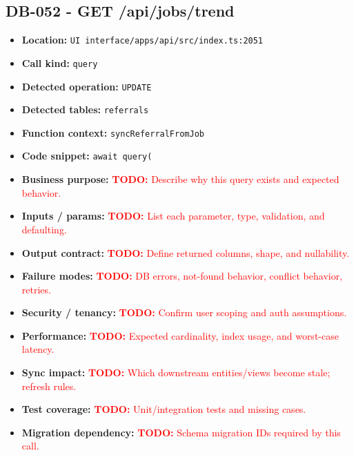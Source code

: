 \documentclass[11pt]{article}
\newcommand{\todoitem}[1]{\textcolor{red}{\textbf{TODO:} #1}}
\begin{document}
\subsection{DB-052 - GET /api/jobs/trend}
\begin{itemize}[leftmargin=1.5em]
\item \textbf{Location:} \texttt{UI interface/apps/api/src/index.ts:2051}
\item \textbf{Call kind:} \texttt{query}
\item \textbf{Detected operation:} \texttt{UPDATE}
\item \textbf{Detected tables:} \texttt{referrals}
\item \textbf{Function context:} \texttt{syncReferralFromJob}
\item \textbf{Code snippet:} \texttt{await query(}
\item \textbf{Business purpose:} \todoitem{Describe why this query exists and expected behavior.}
\item \textbf{Inputs / params:} \todoitem{List each parameter, type, validation, and defaulting.}
\item \textbf{Output contract:} \todoitem{Define returned columns, shape, and nullability.}
\item \textbf{Failure modes:} \todoitem{DB errors, not-found behavior, conflict behavior, retries.}
\item \textbf{Security / tenancy:} \todoitem{Confirm user scoping and auth assumptions.}
\item \textbf{Performance:} \todoitem{Expected cardinality, index usage, and worst-case latency.}
\item \textbf{Sync impact:} \todoitem{Which downstream entities/views become stale; refresh rules.}
\item \textbf{Test coverage:} \todoitem{Unit/integration tests and missing cases.}
\item \textbf{Migration dependency:} \todoitem{Schema migration IDs required by this call.}
\end{itemize}
\end{document}
